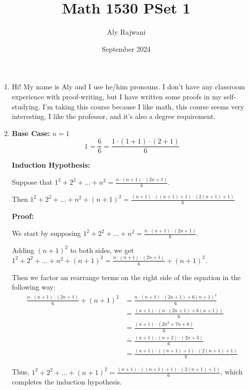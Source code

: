 \documentclass{article}
\title{Math 1530 PSet 1}
\author{Aly Rajwani}
\date{September 2024}
\begin{document}
\maketitle

\begin{enumerate}
    \item Hi! My name is Aly and I use he/him pronouns. I don't have any classroom experience with proof-writing, but I have written some proofs in my self-studying. I'm taking this course because I like math, this course seems very interesting, I like the professor, and it's also a degree requirement. 

    \item 
        \textbf{Base Case:} $n = 1$
        $$1 = \frac{6}{6} = \frac{1 \cdot (1 + 1) \cdot (2 + 1)}{6}$$
    
        
        \textbf{Induction Hypothesis:}
        
        Suppose that $1^2 + 2^2 + \dots + n^2 = \frac{n\cdot (n+1) \cdot (2n + 1)}{6}$. 
        
        Then $1^2 + 2^2 + \dots + n^2 + (n+1)^2 = \frac{(n+1)\cdot ((n+1)+1) \cdot (2(n+1)+1)}{6}$
        
    
        \textbf{Proof:}
        
        We start by supposing $1^2 + 2^2 + \dots + n^2 = \frac{n\cdot (n+1) \cdot (2n + 1)}{6}$.
    
        Adding $(n+1)^2$ to both sides, we get $1^2 + 2^2 + \dots + n^2 +(n+1)^2= \frac{n\cdot (n+1) \cdot (2n + 1)}{6} + (n+1)^2$.
    
        Then we factor an rearrange terms on the right side of the equation in the following way:
        \begin{align*}
            \frac{n\cdot (n+1) \cdot (2n + 1)}{6} + (n+1)^2 &= \frac{n\cdot (n+1) \cdot (2n + 1) + 6(n+1)^2}{6} \\
            &= \frac{(n+1) \cdot (n \cdot (2n+1) + 6(n+1))}{6} \\
            &= \frac{(n+1) \cdot (2n^2 + 7n + 6)}{6} \\
            &= \frac{(n+1) \cdot (n+2) \cdot (2n+3)}{6} \\
            &= \frac{(n+1)\cdot ((n+1)+1) \cdot (2(n+1)+1)}{6}
        \end{align*}
    
        Thus, $1^2 + 2^2 + \dots + (n+1)^2 = \frac{(n+1)\cdot ((n+1)+1) \cdot (2(n+1)+1)}{6}$, which completes the induction hypothesis. 
    

\end{enumerate}
\end{document}
